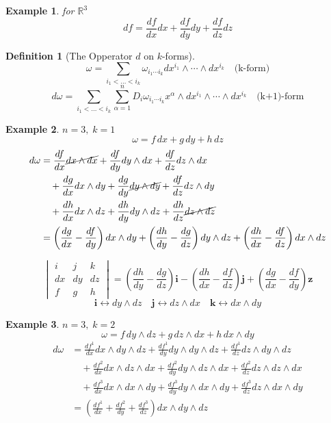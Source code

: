 \documentclass[11pt]{article}
\def\RR{\mathbb{R}}
\newtheorem{definition}{Definition}[section]
\newtheorem{example}{Example}[section]
\begin{document}
\begin{example}
for $\RR^3$
\[ df = \frac{df}{dx}dx + \frac{df}{dy}dy + \frac{df}{dz}dz \]
\end{example}

\begin{definition}[The Opperator $d$ on $k$-forms]
\[\omega = \sum\limits_{i_1<\dots <i_k}\omega_{i_1\cdots i_k}dx^{i_1}\wedge\cdots\wedge dx^{i_k}\quad \text{(k-form)}\]
\[d\omega = \sum\limits_{i_1<\dots <i_k}\sum\limits_{\alpha=1}^nD_i\omega_{i_1\cdots i_k}x^\alpha\wedge dx^{i_1}\wedge\cdots\wedge dx^{i_k}\quad \text{(k+1)-form}\]
\end{definition}

\begin{example}
$n=3, \; k=1$
\[\omega  = f\,dx + g\,dy + h\,dz\]
\begin{align*}
d\omega &= \frac{df}{dx}\cancel{dx\wedge dx} + \frac{df}{dy}dy\wedge dx + \frac{df}{dz}dz\wedge dx\\
& \quad + \frac{dg}{dx}dx\wedge dy + \frac{dg}{dy}\cancel{dy\wedge dy} + \frac{df}{dz}dz\wedge dy\\
& \quad + \frac{dh}{dx}dx\wedge dz + \frac{dh}{dy}dy\wedge dz + \frac{dh}{dz}\cancel{dz\wedge dz} \\
&=  \left(\frac{dg}{dx} - \frac{df}{dy} \right) dx\wedge dy + \left(\frac{dh}{dy} - \frac{dg}{dz} \right) dy\wedge dz +\left(\frac{dh}{dx} - \frac{df}{dz} \right) dx\wedge dz  
\end{align*}

\[\begin{vmatrix} i & j & k\\ dx &dy &dz \\ f &g &h \end{vmatrix} =  \left(\frac{dh}{dy} - \frac{dg}{dz} \right)\mathbf{i}  - \left(\frac{dh}{dx} - \frac{df}{dz} \right) \mathbf{j} +  \left(\frac{dg}{dx} - \frac{df}{dy} \right) \mathbf{z} \]
\[\mathbf{i} \leftrightarrow dy\wedge dz \quad \mathbf{j} \leftrightarrow dz \wedge dx \quad \mathbf{k} \leftrightarrow dx \wedge dy\]
\end{example}

\begin{example}
$n=3, \; k=2$
\[\omega  = f \,dy \wedge dz + g\, dz \wedge  dx  + h \,dx \wedge dy\]
\begin{align*} d\omega &= \frac{df^1}{dx}dx\wedge dy \wedge dz + \frac{df^1}{dy}dy\wedge dy \wedge dz + \frac{df^1}{dz}dz\wedge dy \wedge dz\\
& \quad +\frac{df^2}{dx}dx\wedge dz \wedge dx + \frac{df^2}{dy}dy\wedge dz \wedge dx + \frac{df^2}{dz}dz\wedge dz\wedge dx\\
& \quad + \frac{df^3}{dx}dx\wedge dx \wedge dy + \frac{df^3}{dy}dy\wedge dx \wedge dy + \frac{df^3}{dz}dz\wedge dx \wedge dy\\
&= \left( \frac{df^1}{dx} + \frac{df^2}{dy} + \frac{df^3}{dz} \right)dx\wedge dy \wedge dz
\end{align*}
\end{example}
\end{document}

